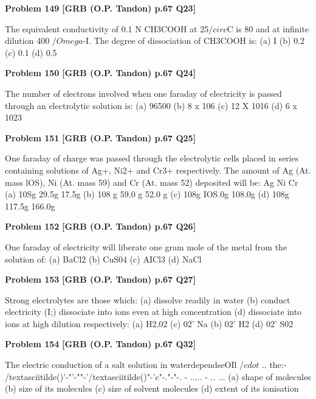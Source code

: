 \begin{problembox}
\textbf{Problem 149} \hfill \textbf{[GRB (O.P. Tandon) p.67 Q23]}
\label{q:ext-grb_all_questions-149}

The equivalent conductivity of 0.1 N CH3COOH at 25$/circ$C is 80 
and at infinite dilution 400 $/Omega$-I. The degree of dissociation 
of CH3COOH is: 
(a) I 
(b) 0.2 
(c) 0.1 
(d) 0.5
\end{problembox}

\begin{problembox}
\textbf{Problem 150} \hfill \textbf{[GRB (O.P. Tandon) p.67 Q24]}
\label{q:ext-grb_all_questions-150}

The number of electrons involved when one faraday of 
electricity is passed through an electrolytic solution is: 
(a) 96500 
(b) 8 x 106 
(c) 12 X 1016 (d) 6 x 1023
\end{problembox}

\begin{problembox}
\textbf{Problem 151} \hfill \textbf{[GRB (O.P. Tandon) p.67 Q25]}
\label{q:ext-grb_all_questions-151}

One faraday of charge was passed through the electrolytic 
cells placed in series containing solutions of Ag+, Ni2+ and 
Cr3+ respectively. The amount of Ag (At. mass lOS), Ni (At. 
mass 59) and Cr (At. mass 52) deposited will be: 
Ag 
Ni 
Cr 
(a) 10Sg 
29.5g 
17.5g 
(b) 108 g 
59.0 g 
52.0 g 
(c) 108g 
IOS.0g 
108.0g 
(d) 108g 
117.5g 
166.0g
\end{problembox}

\begin{problembox}
\textbf{Problem 152} \hfill \textbf{[GRB (O.P. Tandon) p.67 Q26]}
\label{q:ext-grb_all_questions-152}

One faraday of electricity will liberate one gram mole of the 
metal from the solution of: 
(a) BaCl2 
(b) CuS04 
(c) AICl3 
(d) NaCl
\end{problembox}

\begin{problembox}
\textbf{Problem 153} \hfill \textbf{[GRB (O.P. Tandon) p.67 Q27]}
\label{q:ext-grb_all_questions-153}

Strong electrolytes are those which: 
(a) dissolve readily in water 
(b) conduct electricity 
(I;) dissociate into ions even at high concentration 
(d) dissociate into ions at high dilution 
respectively: 
(a) H2,02 
(c) 02' Na 
(b) 02' H2 
(d) 02' S02
\end{problembox}

\begin{problembox}
\textbf{Problem 154} \hfill \textbf{[GRB (O.P. Tandon) p.67 Q32]}
\label{q:ext-grb_all_questions-154}

The electric conduction of a salt solution in waterdependseOIl 
$/cdot$ .. the:-
/textasciitilde()'-"'-""-'/textasciitilde()"-'c"-."-"-. - ..... \underline{\hspace{1cm}}-\underline{\hspace{1cm}} .. \underline{\hspace{1cm}} ... 
(a) shape of molecules 
(b) size of its molecules 
(c) size of solvent molecules (d) extent of its ionisation
\end{problembox}

